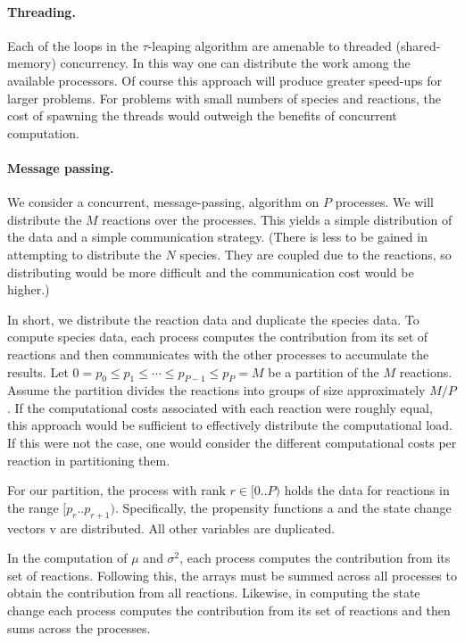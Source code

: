 \documentclass{article}
\begin{document}
\paragraph{Threading.}
Each of the loops in the $\tau$-leaping algorithm are amenable to threaded
(shared-memory) concurrency.  In this way one can distribute the work among
the available processors.  Of course this approach will produce greater 
speed-ups for larger problems.  For problems with small numbers of species
and reactions, the cost of spawning the threads would outweigh the benefits
of concurrent computation.


\paragraph{Message passing.}
We consider a concurrent, message-passing, algorithm on 
$P$ processes.  We will distribute the $M$ reactions over the processes.
This yields a simple distribution of the data and a simple communication 
strategy.  (There is less to be gained in attempting to distribute the 
$N$ species.  They are coupled due to the reactions, so distributing would
be more difficult and the communication cost would be higher.)  

In short, we distribute the reaction data and duplicate the species data.
To compute species data, each process computes the contribution from its 
set of reactions and then communicates with the other processes to 
accumulate the results.  Let 
$0 = p_0 \leq p_1 \leq \cdots \leq p_{P-1} \leq p_P = M$ be a partition of
the $M$ reactions.  Assume the partition divides the reactions into groups
of size approximately $M / P$.  If the computational costs associated with
each reaction were roughly equal, this approach would be sufficient to 
effectively distribute the computational load.  If this were not the case,
one would consider the different computational costs per reaction in
partitioning them.

For our partition, the process with rank $r \in [0..P)$ holds 
the data for reactions in the range $[p_r..p_{r+1})$.
Specifically, the propensity functions a and the state change vectors v
are distributed.  All other variables are duplicated.

In the computation of $\mu$ and $\sigma^2$, each process computes the 
contribution from its set of reactions.  Following this, the arrays must
be summed across all processes to obtain the contribution from all reactions.
Likewise, in computing the state change each process computes the 
contribution from its set of reactions and then sums across the processes.
\end{document}
